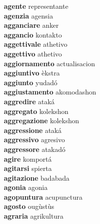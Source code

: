 \textbf{agente } representante \\
\textbf{agenzia } agensia \\
\textbf{agganciare } anker \\
\textbf{aggancio } kontakto \\
\textbf{aggettivale } athetivo \\
\textbf{aggettivo } athetivo \\
\textbf{aggiornamento } actualisacion \\
\textbf{aggiuntivo } èkstra \\
\textbf{aggiunto } yudadó \\
\textbf{aggiustamento } akomodashon \\
\textbf{aggredire } ataká \\
\textbf{aggregato } kolekshon \\
\textbf{aggregazione } kolekshon \\
\textbf{aggressione } ataká \\
\textbf{aggressivo } agresivo \\
\textbf{aggressore } atakadó \\
\textbf{agire } komportá \\
\textbf{agitarsi } spierta \\
\textbf{agitazione } badabada \\
\textbf{agonia } agonia \\
\textbf{agopuntura } acupunctura \\
\textbf{agosto } ougùstùs \\
\textbf{agraria } agrikultura \\

